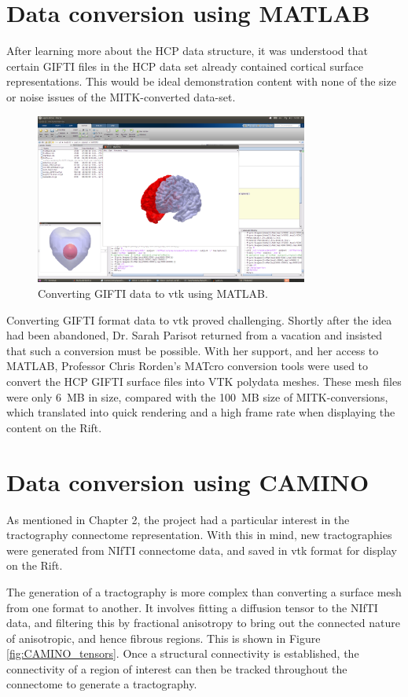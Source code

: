 \documentclass[MSc,paper=a4,pagesize=auto]{icldt}
\begin{document}
\section{Data conversion using MATLAB}
After learning more about the HCP data structure, it was understood that certain GIFTI files in the HCP data set already contained cortical surface representations. This would be ideal demonstration content with none of the size or noise issues of the MITK-converted data-set. 

\begin{figure}[htbp!]
    \centering
    \includegraphics[width=0.8\textwidth]{resources/MATLAB_conversion}
    \caption{Converting GIFTI data to vtk using MATLAB.}
    \label{fig:MATLAB_conversion}
\end{figure}

Converting GIFTI format data to vtk proved challenging. Shortly after the idea had been abandoned, Dr. Sarah Parisot returned from a vacation and insisted that such a conversion must be possible. With her support, and her access to MATLAB, Professor Chris Rorden's MATcro conversion tools were used to convert the HCP GIFTI surface files into VTK polydata meshes. These mesh files were only \SI{6}{MB} in size, compared with the \SI{100}{MB} size of MITK-conversions, which translated into quick rendering and a high frame rate when displaying the content on the Rift.

\section{Data conversion using CAMINO}
As mentioned in Chapter 2, the project had a particular interest in the tractography connectome representation. With this in mind, new tractographies were generated from NIfTI connectome data, and saved in vtk format for display on the Rift.

The generation of a tractography is more complex than converting a surface mesh from one format to another. It involves fitting a diffusion tensor to the NIfTI data, and filtering this by fractional anisotropy to bring out the connected nature of anisotropic, and hence fibrous regions. This is shown in Figure \ref{fig:CAMINO_tensors}. Once a structural connectivity is established, the connectivity of a region of interest can then be tracked throughout the connectome to generate a tractography.
\end{document}

